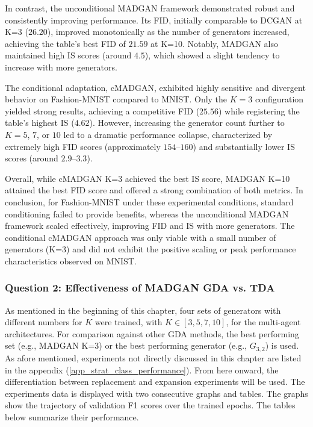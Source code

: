 In contrast, the unconditional MADGAN framework demonstrated robust and consistently improving performance. Its FID, initially comparable to DCGAN at K=3 ($26.20$), improved monotonically as the number of generators increased, achieving the table's best FID of $21.59$ at K=10. Notably, MADGAN also maintained high IS scores (around $4.5$), which showed a slight tendency to increase with more generators.

The conditional adaptation, cMADGAN, exhibited highly sensitive and divergent behavior on Fashion-MNIST compared to MNIST. Only the $K = 3$ configuration yielded strong results, achieving a competitive FID ($25.56$) while registering the table's highest IS ($4.62$). However, increasing the generator count further to $K = 5$, $7$, or $10$ led to a dramatic performance collapse, characterized by extremely high FID scores (approximately $154$–$160$) and substantially lower IS scores (around $2.9$–$3.3$).

Overall, while cMADGAN K=3 achieved the best IS score, MADGAN K=10 attained the best FID score and offered a strong combination of both metrics. In conclusion, for Fashion-MNIST under these experimental conditions, standard conditioning failed to provide benefits, whereas the unconditional MADGAN framework scaled effectively, improving FID and IS with more generators. The conditional cMADGAN approach was only viable with a small number of generators (K=3) and did not exhibit the positive scaling or peak performance characteristics observed on MNIST.

\subsubsection[Question 2]{Question 2: Effectiveness of MADGAN GDA vs. TDA}\label{exp_results_ans_q2}
As mentioned in the beginning of this chapter, four sets of generators with different numbers for \(K\) were trained, with \(K \in [3, 5, 7, 10]\), for the multi-agent architectures. For comparison against other GDA methods, the best performing set (e.g., MADGAN K=3) or the best performing generator (e.g., \(G_{3,2}\)) is used. As afore mentioned, experiments not directly discussed in this chapter are listed in the appendix (\ref{app_strat_class_performance}). From here onward, the differentiation between replacement and expansion experiments will be used. The experiments data is displayed with two consecutive graphs and tables. The graphs show the trajectory of validation F1 scores over the trained epochs. The tables below summarize their performance.

